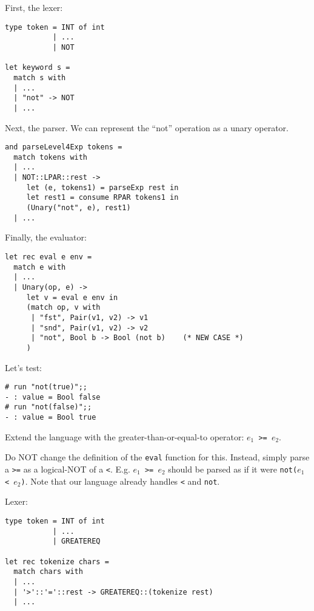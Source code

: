 \documentclass[addpoints]{exam}
\begin{document}
\begin{questions}
\begin{solution}
    First, the lexer:
    
    \begin{verbatim}
type token = INT of int
           | ...
           | NOT

let keyword s =
  match s with
  | ...
  | "not" -> NOT
  | ...
    \end{verbatim}

    Next, the parser. We can represent the ``not'' operation
    as a unary operator.

    \begin{verbatim}
and parseLevel4Exp tokens =
  match tokens with
  | ...
  | NOT::LPAR::rest ->
     let (e, tokens1) = parseExp rest in
     let rest1 = consume RPAR tokens1 in
     (Unary("not", e), rest1)
  | ...
    \end{verbatim}

    Finally, the evaluator:

    \begin{verbatim}
let rec eval e env =
  match e with
  | ...
  | Unary(op, e) ->
     let v = eval e env in
     (match op, v with
      | "fst", Pair(v1, v2) -> v1
      | "snd", Pair(v1, v2) -> v2
      | "not", Bool b -> Bool (not b)    (* NEW CASE *)
     )
    \end{verbatim}
    
    Let's test:
    \begin{verbatim}
# run "not(true)";;
- : value = Bool false
# run "not(false)";;
- : value = Bool true
    \end{verbatim}
  \end{solution}

  
  \question
  Extend the language with
  the greater-than-or-equal-to operator: \texttt{$e_1$ >= $e_2$}.

  Do NOT change the definition of the \texttt{eval} function for this.
  Instead, simply parse a \texttt{>=}
  as a logical-NOT of a \texttt{<}.
  E.g. \texttt{$e_1$ >= $e_2$} should be parsed
  as if it were \texttt{not($e_1$ < $e_2$)}.
  Note that our language already handles \texttt{<} and \texttt{not}.

  \begin{solution}
    Lexer:
    \begin{verbatim}
type token = INT of int
           | ...
           | GREATEREQ      

let rec tokenize chars =
  match chars with
  | ...
  | '>'::'='::rest -> GREATEREQ::(tokenize rest)
  | ...
    \end{verbatim}    


\end{solution}
\end{questions}
\end{document}
